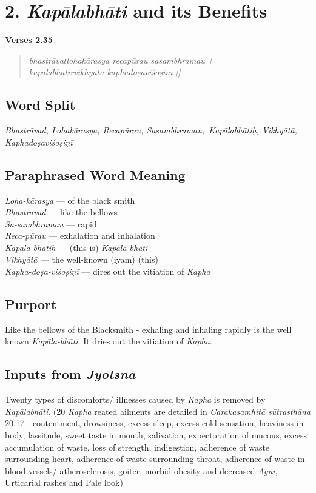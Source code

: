 \section*{2. \textit{Kapālabhāti} and its Benefits}

\noindent \textbf{Verses 2.35}

\begin{verse}
\textit{bhastrāvallohakārasya recapūrau sasambhramau |\\
kapālabhātirvikhyātā kaphadoṣaviśoṣiṇī ||}
\end{verse}

\subsection*{Word Split}


\textit{Bhastrāvad, Lohakārasya, Recapūrau, Sasambhramau, Kapālabhātiḥ, Vikhyātā, Kaphadoṣaviśoṣiṇī}

\subsection*{Paraphrased Word Meaning}


\begin{multicols}{2}
\textit{Loha-kārasya} --- of the black smith \\
\textit{Bhastrāvad} --- like the bellows \\
\textit{Sa-sambhramau} --- rapid\\
\textit{Reca-pūrau} --- exhalation and inhalation \\
\textit{Kapāla-bhātiḥ} --- (this is) \textit{Kapāla-bhāti}\\
\textit{Vikhyātā ---} the well-known (iyam) (this)\\
\textit{Kapha-doṣa-viśoṣiṇī} --- dires out the vitiation of \textit{Kapha} 
\end{multicols}

\subsection*{Purport}


Like the bellows of the Blacksmith - exhaling and inhaling rapidly is the well known \textit{Kapāla-bhāti}. It dries out the vitiation of \textit{Kapha}.

\subsection*{Inputs from \textit{Jyotsnā}}


Twenty types of discomforts/ illnesses caused by \textit{Kapha} is removed by \textit{Kapālabhāti}. (20 \textit{Kapha} reated ailments are detailed in  \textit{Carakasamhitā sūtrasthāna} 20.17  -  contentment, drowsiness, excess sleep, excess cold sensation, heaviness in body, lassitude, sweet taste in mouth, salivation, expectoration of mucous, excess accumulation of waste, loss of strength, indigestion, adherence of waste surrounding heart, adherence of waste surrounding throat, adherence of waste in blood vessels/ atherosclerosis, goiter, morbid obesity and decreased \textit{Agni}, Urticarial rashes and Pale look)
